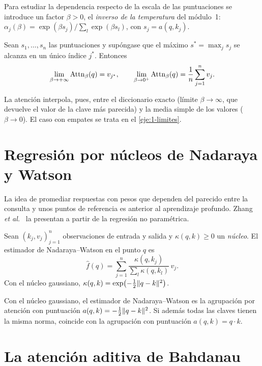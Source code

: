 Para estudiar la dependencia respecto de la escala de las puntuaciones se introduce un factor $\beta>0$, el \emph{inverso de la temperatura} del módulo~1: $\alpha_j(\beta)=\exp(\beta s_j)/\sum_l\exp(\beta s_l)$, con $s_j=a(q,k_j)$.

\begin{teorema}\label{teo:limites}
Sean $s_1,\dots,s_n$ las puntuaciones y supóngase que el máximo $s^{\ast}=\max_js_j$ se alcanza en un único índice $j^{\ast}$. Entonces
\[
\lim_{\beta\to+\infty}\operatorname{Attn}_\beta(q)=v_{j^{\ast}},\qquad
\lim_{\beta\to 0^{+}}\operatorname{Attn}_\beta(q)=\frac{1}{n}\sum_{j=1}^{n}v_j .
\]
\end{teorema}

La atención interpola, pues, entre el diccionario exacto (límite $\beta\to\infty$, que devuelve el valor de la clave más parecida) y la media simple de los valores ($\beta\to 0$). El caso con empates se trata en el \cref{eje:1-limites}.

\section{Regresión por núcleos de Nadaraya y Watson}

La idea de promediar respuestas con pesos que dependen del parecido entre la consulta y unos puntos de referencia es anterior al aprendizaje profundo. Zhang \emph{et al.}~\cite[§11.2]{d2l} la presentan a partir de la regresión no paramétrica.

\begin{definicion}\label{def:nw}
Sean $(k_j,v_j)_{j=1}^{n}$ observaciones de entrada y salida y $\kappa(q,k)\ge 0$ un \emph{núcleo}. El estimador de Nadaraya--Watson en el punto $q$ es
\[
\hat f(q)=\sum_{j=1}^{n}\frac{\kappa(q,k_j)}{\sum_{l}\kappa(q,k_l)}\,v_j .
\]
Con el núcleo gaussiano, $\kappa(q,k)=\exp\bigl(-\tfrac12\lVert q-k\rVert^{2}\bigr)$.
\end{definicion}

\begin{proposicion}\label{prop:gauss}
Con el núcleo gaussiano, el estimador de Nadaraya--Watson es la agrupación por atención con puntuación $a(q,k)=-\tfrac12\lVert q-k\rVert^{2}$. Si además todas las claves tienen la misma norma, coincide con la agrupación con puntuación $a(q,k)=q\cdot k$.
\end{proposicion}

\section{La atención aditiva de Bahdanau}
\label{sec:bahdanau}


